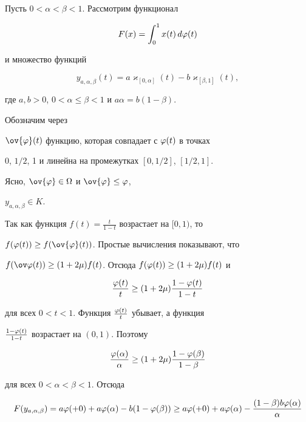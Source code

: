 \begin{pf}


Пусть $0 < \alpha < \beta <1$. Рассмотрим функционал


$$


F(x) = \intl{0}{1} x(t)\, d\ph(t)


$$


и множество функций


$$


y_{a,\alpha, \beta}(t) =


a\varkappa_{[0, \alpha]} (t) - b \varkappa_{[\beta, 1]} (t), 


$$


где $a, b >0$, $0<\alpha\le \beta<1$ и $a\alpha = b (1- \beta)$.


Обозначим через


$\ov{\ph} (t)$ функцию, которая совпадает с $\varphi(t)$ в точках


0, $1/2$, 1 и линейна на промежутках $[0, 1/2]$, $[1/2, 1]$. 


Ясно, $\ov{\ph}\in \Om$ и $\ov{\ph} \le \ph$, 


$y_{a,\alpha, \beta} \in K$. 





Так как функция $f(t) = \frac t {1-t}$ возрастает на $[0, 1)$, то


$f(\ph(t)) \ge f(\ov{\ph}(t))$. Простые вычисления показывают, что


$f(\ov \ph(t)) \ge (1 + 2\mu) f(t)$. Отсюда $f(\varphi(t)) \ge (1 + 2\mu)f(t)$ и


$$


\frac {\ph(t)} {t} \ge (1+2\mu) \frac {1 -\ph(t)} {1-t}


$$


для всех $0 < t < 1$. Функция $\frac {\varphi(t)} t$ убывает, а функция


$\frac {1 - \varphi(t)} {1-t}$ возрастает на $(0,1)$. Поэтому


$$


\frac {\ph(\alpha)} \alpha \ge ( 1 + 2\mu ) \frac {1- \ph(\beta)}


{1-\beta}


$$


для всех $0 < \alpha< \beta <1$. Отсюда


\begin{multline}\label{e14}


F(y_{a,\alpha, \beta}) = a\ph(+0) + a \ph(\alpha) - b (1 - \ph(\beta))


\ge a\ph(+0)+ a\ph(\alpha) - \frac {(1-\beta) b\ph(\alpha)} {\alpha


}
\end{multline}
\end{pf}
